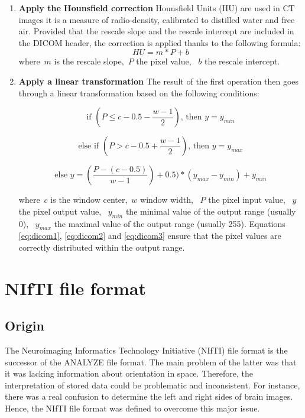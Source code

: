 \begin{enumerate}
	\item \textbf{Apply the Hounsfield correction}\newline
	Hounsfield Units (HU) are used in CT images it is a measure of radio-density, calibrated to distilled water and free air. Provided that the rescale slope and the rescale intercept are included in the DICOM header, the correction is applied thanks to the following formula:
\begin{equation}
	HU = m * P + b
\end{equation}
	where~$m$ is the rescale slope,~$P$ the pixel value, ~$b$ the rescale intercept.

	\item \textbf{Apply a linear transformation}\newline
	The result of the first operation then goes through a linear transformation based on the following conditions: 

\begin{equation}\label{eq:dicom1}
\textrm{if } (P \leq c - 0.5 - \frac{w-1}{2}) \textrm{, then }y = y_{min}
\end{equation}

\begin{equation}\label{eq:dicom2}
\textrm{else if } (P > c - 0.5 + \frac{w-1}{2}) \textrm{, then }y = y_{max}
\end{equation}

\begin{equation}\label{eq:dicom3}
\textrm{else } y = (\frac{P - (c - 0.5)}{w-1}) + 0.5) * (y_{max} - y_{min}) + y_{min}
\end{equation}

where~$c$ is the window center,~$w$ window width, ~$P$ the pixel input value, ~$y$ the pixel output value, ~$y_{min}$ the minimal value of the output range (usually 0), ~$y_{max}$ the maximal value of the output range (usually 255). Equations \ref{eq:dicom1}, \ref{eq:dicom2} and \ref{eq:dicom3} ensure that the pixel values are correctly distributed within the output range. 
\end{enumerate}


\section{NIfTI file format}
\subsection{Origin}
\setlength{\marginparwidth}{3cm}\leavevmode {}The Neuroimaging Informatics Technology Initiative (NIfTI) file format is the successor of the ANALYZE file format. The main problem of the latter was that it was lacking information about orientation in space. Therefore, the interpretation of stored data could be problematic and inconsistent. For instance, there was a real confusion to determine the left and right sides of brain images. Hence, the NIfTI file format was defined to overcome this major issue.


